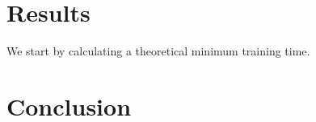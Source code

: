 \documentclass[11pt]{article}
\begin{document}
\section{Results}
We start by calculating a theoretical minimum training time. 

\section{Conclusion}
 
\end{document}
